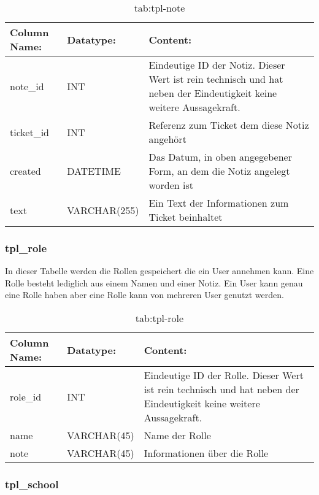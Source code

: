 \begin{table}[h]
	\begin{tabular}{|p{3.5cm}|p{4cm}|p{6.2cm}|}
		\hline
		\textbf{Column Name:} & \textbf{Datatype:} & \textbf{Content:}\\
		\hline
		note\_id & INT & Eindeutige ID der Notiz. Dieser Wert ist rein technisch und hat neben der Eindeutigkeit keine weitere Aussagekraft.\\
		\hline
		ticket\_id & INT & Referenz zum Ticket dem diese Notiz angehört\\
		\hline
		created & DATETIME & Das Datum, in oben angegebener Form, an dem die Notiz angelegt worden ist\\
		\hline
		text & VARCHAR(255) & Ein Text der Informationen zum Ticket beinhaltet\\
		\hline
	\end{tabular}
	\caption{tab:tpl-note}
\end{table}
\label{tab:tpl_note}

\newpage

\subsubsection{tpl\_role}

In dieser Tabelle werden die Rollen gespeichert die ein User annehmen kann. Eine Rolle besteht lediglich aus einem Namen und einer Notiz. Ein User kann genau eine Rolle haben aber eine Rolle kann von mehreren User genutzt werden. 

\begin{table}[h]
	\begin{tabular}{|p{3.5cm}|p{4cm}|p{6.2cm}|}
		\hline
		\textbf{Column Name:} & \textbf{Datatype:} & \textbf{Content:}\\
		\hline
		role\_id & INT & Eindeutige ID der Rolle. Dieser Wert ist rein technisch und hat neben der Eindeutigkeit keine weitere Aussagekraft.\\
		\hline
		name & VARCHAR(45) & Name der Rolle\\
		\hline
		note & VARCHAR(45) & Informationen über die Rolle\\
		\hline
	\end{tabular}
	\caption{tab:tpl-role}
\end{table}
\label{tab:tpl_role}

\newpage

\subsubsection{tpl\_school}

